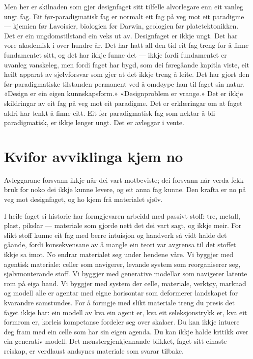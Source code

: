Men her er skilnaden som gjer designfaget sitt tilfelle alvorlegare enn eit vanleg ungt fag. Eit før-paradigmatisk fag er normalt eit fag på veg mot eit paradigme — kjemien før Lavoisier, biologien før Darwin, geologien før platetektonikken. Det er ein ungdomstilstand ein veks ut av. Designfaget er ikkje ungt. Det har vore akademisk i over hundre år. Det har hatt all den tid eit fag treng for å finne fundamentet sitt, og det har ikkje funne det — ikkje fordi fundamentet er uvanleg vanskeleg, men fordi faget har bygd, som dei føregåande kapitla viste, eit heilt apparat av sjølvforsvar som gjer at det ikkje treng å leite. Det har gjort den før-paradigmatiske tilstanden permanent ved å omdøype han til faget sin natur. «Design er ein eigen kunnskapsform.» «Designproblem er vrange.» Det er ikkje skildringar av eit fag på veg mot eit paradigme. Det er erklæringar om at faget aldri har tenkt å finne eitt. Eit før-paradigmatisk fag som nektar å bli paradigmatisk, er ikkje lenger ungt. Det er avleggar i vente.

\section{Kvifor avviklinga kjem no}

Avleggarane forsvann ikkje når dei vart motbeviste; dei forsvann når verda fekk bruk for noko dei ikkje kunne levere, og eit anna fag kunne. Den krafta er no på veg mot designfaget, og ho kjem frå materialet sjølv.

I heile faget si historie har formgjevaren arbeidd med passivt stoff: tre, metall, plast, pikslar — materiale som gjorde nett det dei vart sagt, og ikkje meir. For slikt stoff kunne eit fag med berre intuisjon og handverk så vidt halde det gåande, fordi konsekvensane av å mangle ein teori var avgrensa til det stoffet ikkje sa imot. No endrar materialet seg under hendene våre. Vi byggjer med agentisk materiale: celler som navigerer, levande system som reorganiserer seg, sjølvmonterande stoff. Vi byggjer med generative modellar som navigerer latente rom på eiga hand. Vi byggjer med system der celle, materiale, verktøy, marknad og modell alle er agentar med eigne horisontar som deformerer landskapet for kvarandre samstundes. For å formgje med slikt materiale treng du presis det faget ikkje har: ein modell av kva ein agent er, kva eit seleksjonstrykk er, kva eit formrom er, korleis kompetanse fordeler seg over skalaer. Du kan ikkje intuere deg fram med ein celle som har sin eigen agenda. Du kan ikkje halde kritikk over ein generativ modell. Det mønstergjenkjennande blikket, faget sitt einaste reiskap, er verdlaust andsynes materiale som svarar tilbake.

